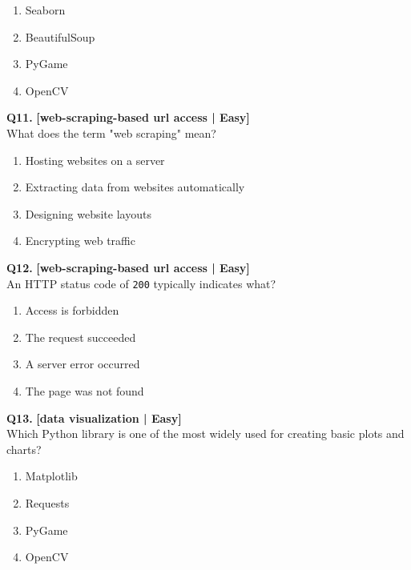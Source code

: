 \begin{enumerate}[label=(\alph*),topsep=2pt,itemsep=1pt,partopsep=0pt,parsep=0pt]
    \item \relax Seaborn
    \item \relax BeautifulSoup
    \item \relax PyGame
    \item \relax OpenCV
\end{enumerate}
\vspace{2mm}

\noindent\textbf{Q11.} \hfill {\small\color{LPUOrange}\textbf{[web-scraping-based url access | Easy]}}\\[2pt]
What does the term "web scraping" mean?

\begin{enumerate}[label=(\alph*),topsep=2pt,itemsep=1pt,partopsep=0pt,parsep=0pt]
    \item \relax Hosting websites on a server
    \item \relax Extracting data from websites automatically
    \item \relax Designing website layouts
    \item \relax Encrypting web traffic
\end{enumerate}
\vspace{2mm}

\noindent\textbf{Q12.} \hfill {\small\color{LPUOrange}\textbf{[web-scraping-based url access | Easy]}}\\[2pt]
An HTTP status code of \texttt{200} typically indicates what?

\begin{enumerate}[label=(\alph*),topsep=2pt,itemsep=1pt,partopsep=0pt,parsep=0pt]
    \item \relax Access is forbidden
    \item \relax The request succeeded
    \item \relax A server error occurred
    \item \relax The page was not found
\end{enumerate}
\vspace{2mm}

\noindent\textbf{Q13.} \hfill {\small\color{LPUOrange}\textbf{[data visualization | Easy]}}\\[2pt]
Which Python library is one of the most widely used for creating basic plots and charts?

\begin{enumerate}[label=(\alph*),topsep=2pt,itemsep=1pt,partopsep=0pt,parsep=0pt]
    \item \relax Matplotlib
    \item \relax Requests
    \item \relax PyGame
    \item \relax OpenCV
\end{enumerate}
\vspace{2mm}

